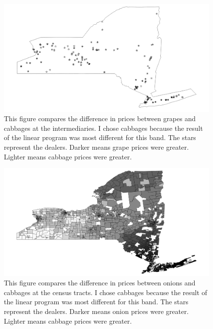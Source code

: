 \documentclass{report}
\begin{document}
\begin{figure}
\centering
\begin{framed}
\includegraphics[scale=.50]{procs_243_69}
\caption{This figure compares the difference in prices between grapes and cabbages at the intermediaries. I chose cabbages because the result of the linear program was most different for this band. The stars represent the dealers. Darker means grape prices were greater. Lighter means cabbage prices were greater.}
\label{fig:procs_243_69}
\end{framed}
\end{figure}

\begin{figure}
\centering
\begin{framed}
\includegraphics[scale=.50]{stores_243_49}
\caption{This figure compares the difference in prices between onions and cabbages at the census tracts. I chose cabbages because the result of the linear program was most different for this band. The stars represent the dealers. Darker means onion prices were greater. Lighter means cabbage prices were greater.}
\label{fig:stores_243_49}
\end{framed}
\end{figure}
\end{document}
